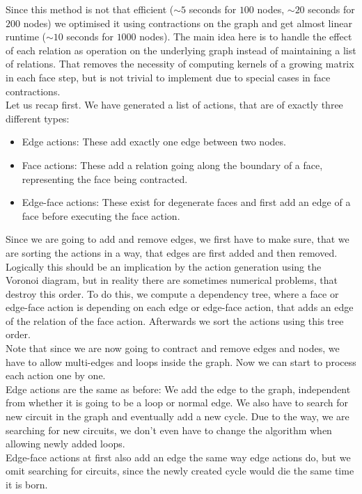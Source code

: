 \documentclass[11pt, a4paper, UKenglish]{article}
\begin{document}
    Since this method is not that efficient ($\sim5$ seconds for $100$ nodes, $\sim20$ seconds for $200$ nodes) we optimised it using contractions on the graph and get almost linear runtime ($\sim10$ seconds for $1000$ nodes).
    The main idea here is to handle the effect of each relation as operation on the underlying graph instead of maintaining a list of relations.
    That removes the necessity of computing kernels of a growing matrix in each face step, but is not trivial to implement due to special cases in face contractions.\\
    Let us recap first.
    We have generated a list of actions, that are of exactly three different types:
    \begin{itemize}
        \item Edge actions: These add exactly one edge between two nodes.
        \item Face actions: These add a relation going along the boundary of a face, representing the face being contracted.
        \item Edge-face actions: These exist for degenerate faces and first add an edge of a face before executing the face action.
    \end{itemize}
    Since we are going to add and remove edges, we first have to make sure, that we are sorting the actions in a way, that edges are first added and then removed.
    Logically this should be an implication by the action generation using the Voronoi diagram, but in reality there are sometimes numerical problems, that destroy this order.
    To do this, we compute a dependency tree, where a face or edge-face action is depending on each edge or edge-face action, that adds an edge of the relation of the face action.
    Afterwards we sort the actions using this tree order.\\
    Note that since we are now going to contract and remove edges and nodes, we have to allow multi-edges and loops inside the graph.
    Now we can start to process each action one by one.\\
    Edge actions are the same as before: We add the edge to the graph, independent from whether it is going to be a loop or normal edge.
    We also have to search for new circuit in the graph and eventually add a new cycle.
    Due to the way, we are searching for new circuits, we don't even have to change the algorithm when allowing newly added loops.\\
    Edge-face actions at first also add an edge the same way edge actions do, but we omit searching for circuits, since the newly created cycle would die the same time it is born.
\end{document}
